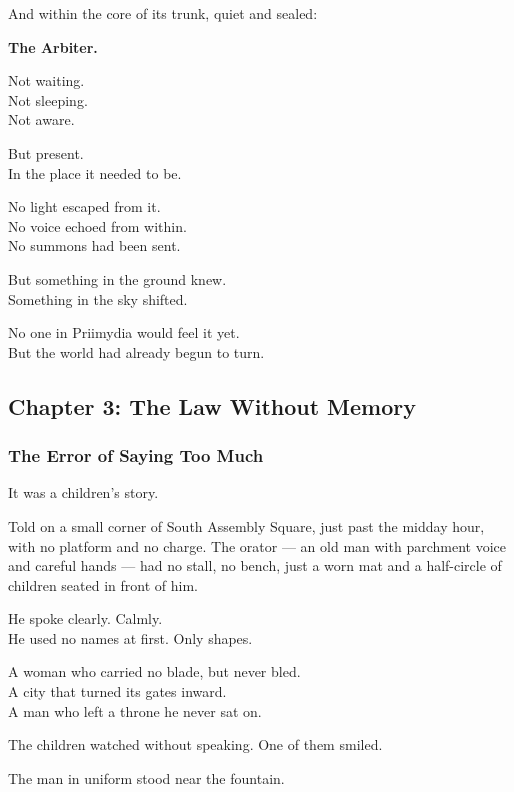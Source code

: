 \documentclass[12pt]{article}
\begin{document}
And within the core of its trunk, quiet and sealed:

\textbf{The Arbiter.}

Not waiting.\\
Not sleeping.\\
Not aware.

But present.\\
In the place it needed to be.

No light escaped from it.\\
No voice echoed from within.\\
No summons had been sent.

But something in the ground knew.\\
Something in the sky shifted.

No one in Priimydia would feel it yet.\\
But the world had already begun to turn.

\newpage

\subsection*{Chapter 3: The Law Without Memory}

\vspace{.5in}

\subsubsection*{The Error of Saying Too Much}

It was a children’s story.

Told on a small corner of South Assembly Square, just past the midday hour, with no platform and no charge. The orator --- an old man with parchment voice and careful hands --- had no stall, no bench, just a worn mat and a half-circle of children seated in front of him.

He spoke clearly. Calmly.\\
He used no names at first. Only shapes.

A woman who carried no blade, but never bled.\\
A city that turned its gates inward.\\
A man who left a throne he never sat on.

The children watched without speaking. One of them smiled.

\vspace{1em}

The man in uniform stood near the fountain.
\end{document}
